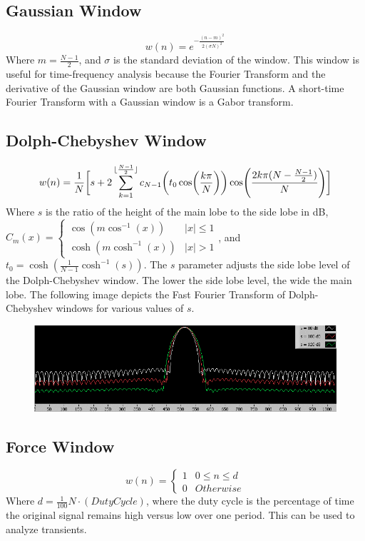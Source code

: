 \documentclass{article}
\theoremstyle{mystyle}
\DeclarePairedDelimiter\floor{\lfloor}{\rfloor}
\begin{document}
\subsection{Gaussian Window}
\begin{equation}
w(n) = e^{-\frac{(n-m)^2}{2(\sigma N)^2}}
\end{equation}
\noindent Where $m = \frac{N-1}{2}$, and $\sigma$ is the standard deviation of the window. This window is useful for time-frequency analysis because the Fourier Transform and the derivative of the Gaussian window are both Gaussian functions. A short-time Fourier Transform with a Gaussian window is a Gabor transform.
\subsection{Dolph-Chebyshev Window}
\begin{equation}
w(n) = \frac{1}{N}\bigg[s+2\sum_{k=1}^{\floor{\frac{N-1}{2}}}c_{N-1}\bigg(t_{0}\cos(\frac{k\pi}{N})\bigg)\cos(\frac{2k\pi(N-\frac{N-1}{2})}{N})\bigg]
\end{equation}
\noindent Where $s$ is the ratio of the height of the main lobe to the side lobe in dB, $C_{m}(x) = \begin{cases} \cos(m\cos^{-1}(x)) & |x|\leq 1 \\ \cosh(m\cosh^{-1}(x)) & |x|>1\end{cases}$, and $t_{0} = \cosh(\frac{1}{N-1}\cosh^{-1}(s))$. The $s$ parameter adjusts the side lobe level of the Dolph-Chebyshev window. The lower the side lobe level, the wide the main lobe. The following image depicts the Fast Fourier Transform of Dolph-Chebyshev windows for various values of $s$.
\begin{figure}[htbp]
  \centering
{\includegraphics[scale=0.65]{CDSW_3}}
  \hfill
\end{figure}
\subsection{Force Window}
\begin{equation}
w(n) = \begin{cases} 1 & 0 \leq n \leq d \\ 0 & Otherwise \end{cases}
\end{equation}
\noindent Where $d = \frac{1}{100}N\cdot (Duty Cycle)$, where the duty cycle is the percentage of time the original signal remains high versus low over one period. This can be used to analyze transients.
\end{document}
